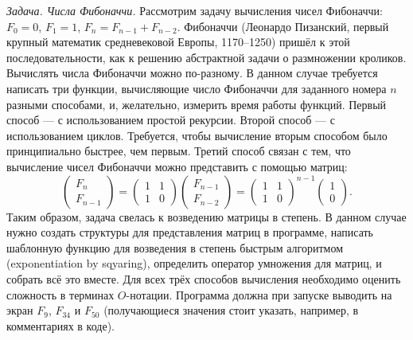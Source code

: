 \documentclass{book}
\begin{document}
\textit{Задача. Числа Фибоначчи.}
Рассмотрим задачу вычисления чисел Фибоначчи: $F_0 = 0$, $F_1 = 1$, $F_n = F_{n-1} + F_{n-2}$.
Фибоначчи (Леонардо Пизанский, первый крупный математик средневековой Европы, 1170--1250) пришёл к
этой последовательности, как к решению абстрактной задачи о размножении кроликов. Вычислять числа
Фибоначчи можно по-разному. В данном случае требуется написать три функции, вычисляющие число
Фибоначчи для заданного номера $n$ разными способами, и, желательно, измерить время работы функций.
Первый способ --- с использованием простой рекурсии. Второй способ --- с использованием циклов.
Требуется, чтобы вычисление вторым способом было принципиально быстрее, чем первым. Третий способ
связан с тем, что вычисление чисел Фибоначчи можно представить с помощью матриц:
\begin{equation}
    \begin{pmatrix}
        F_n \\
        F_{n-1}
    \end{pmatrix} =
    \begin{pmatrix}
        1 & 1 \\
        1 & 0
    \end{pmatrix}
    \begin{pmatrix}
        F_{n - 1} \\
        F_{n - 2}
    \end{pmatrix} =
    \begin{pmatrix}
        1 & 1 \\
        1 & 0
    \end{pmatrix}^{n - 1}
    \begin{pmatrix}
        1 \\
        0
    \end{pmatrix}.
\end{equation}
Таким образом, задача свелась к возведению матрицы в степень. В данном случае нужно создать
структуры для представления матриц в программе, написать шаблонную функцию для возведения в степень
быстрым алгоритмом (exponentiation by sqyaring), определить оператор умножения для матриц, и
собрать всё это вместе. Для всех трёх способов вычисления необходимо оценить сложность в терминах
$O$-нотации. Программа должна при запуске выводить на экран $F_{9}$, $F_{34}$ и $F_{50}$
(получающиеся значения стоит указать, например, в комментариях в коде).

\clearpage
\end{document}
